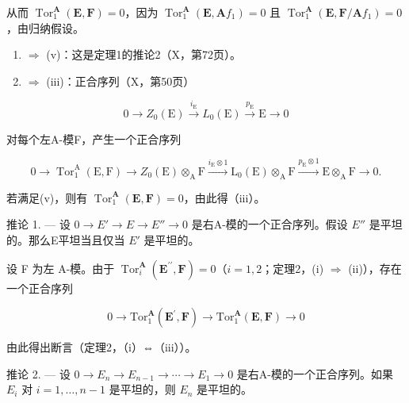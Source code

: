 从而 \(\operatorname{Tor}_{1}^{\mathbf{A}}(\mathbf{E},\mathbf{F})=0\)，因为 \(\operatorname{Tor}_{1}^{\mathbf{A}}(\mathbf{E},\mathbf{A}f_{1})=0\) 且 \(\operatorname{Tor}_{1}^{\mathbf{A}}(\mathbf{E},\mathbf{F}/\mathbf{A}f_{1})=0\)，由归纳假设。

\begin{enumerate}
\def\labelenumi{(\roman{enumi})}
\item
  \(\Rightarrow\) (v)：这是定理1的推论2（X，第72页）。
\item
  \(\Rightarrow\) (iii)：正合序列（X，第50页）
\end{enumerate}

\[
0 \longrightarrow Z _ {0} (\mathrm{E}) \stackrel {i _ {\mathrm{E}}} {\longrightarrow} L _ {0} (\mathrm{E}) \stackrel {p _ {\mathrm{E}}} {\longrightarrow} \mathrm{E} \longrightarrow 0
\]

对每个左A-模F，产生一个正合序列

\[
0 \longrightarrow \operatorname{Tor} _ {1} ^ {\mathrm{A}} (\mathrm{E}, \mathrm{F}) \longrightarrow Z _ {0} (\mathrm{E}) \otimes_ {\mathrm{A}} \mathrm{F} \xrightarrow {i _ {\mathrm{E}} \otimes 1} \mathrm{L} _ {0} (\mathrm{E}) \otimes_ {\mathrm{A}} \mathrm{F} \xrightarrow {p _ {\mathrm{E}} \otimes 1} \mathrm{E} \otimes_ {\mathrm{A}} \mathrm{F} \longrightarrow 0.
\]

若满足(v)，则有 \(\operatorname{Tor}_1^{\mathbf{A}}(\mathbf{E},\mathbf{F}) = 0\)，由此得（iii）。

推论 1. --- 设 \(0 \to E' \to E \to E'' \to 0\) 是右A-模的一个正合序列。假设 \(E''\) 是平坦的。那么E平坦当且仅当 \(E'\) 是平坦的。

设 F 为左 A-模。由于 \(\operatorname{Tor}_i^{\mathbf{A}}(\mathbf{E}^{\prime \prime},\mathbf{F}) = 0\)（\(i = 1,2\)；定理2，(i) \(\Rightarrow\) (ii)），存在一个正合序列

\[
0 \to \mathrm{Tor} _ {1} ^ {\mathbf {A}} (\mathbf {E} ^ {\prime}, \mathbf {F}) \to \mathrm{Tor} _ {1} ^ {\mathbf {A}} (\mathbf {E}, \mathbf {F}) \to 0
\]

由此得出断言（定理2，（i）⇔（iii））。

推论 2. --- 设 \(0 \to E_n \to E_{n-1} \to \cdots \to E_1 \to 0\) 是右A-模的一个正合序列。如果 \(E_i\) 对 \(i = 1, \ldots, n-1\) 是平坦的，则 \(E_n\) 是平坦的。
